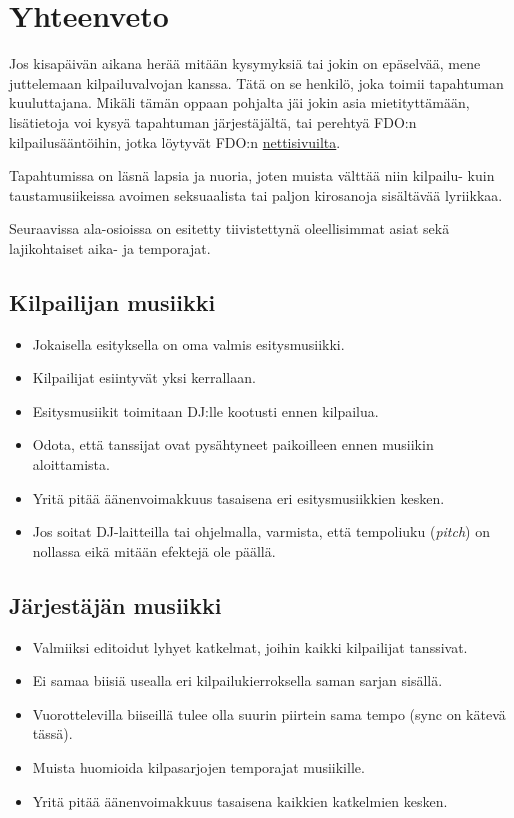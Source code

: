 \documentclass[12pt, a4paper, oneside]{article}
\begin{document}
\section{Yhteenveto} \label{sec:yhteenveto}

Jos kisapäivän aikana herää mitään kysymyksiä tai jokin on epäselvää,
mene juttelemaan kilpailuvalvojan kanssa.
Tätä on se henkilö,
joka toimii tapahtuman kuuluttajana.
Mikäli tämän oppaan pohjalta jäi jokin asia mietityttämään,
lisätietoja voi kysyä tapahtuman järjestäjältä,
tai perehtyä FDO:n kilpailusääntöihin,
jotka löytyvät FDO:n \href{https://fdo.fi/kilpailut/}{nettisivuilta}.

Tapahtumissa on läsnä lapsia ja nuoria,
joten muista välttää niin kilpailu- kuin taustamusiikeissa avoimen seksuaalista tai paljon kirosanoja sisältävää lyriikkaa.

Seuraavissa ala-osioissa on esitetty tiivistettynä oleellisimmat asiat sekä lajikohtaiset aika- ja temporajat.

\subsection{Kilpailijan musiikki} \label{subsec:kilpailijan-musiikki}

\begin{itemize}[itemsep=-2pt]
    \item Jokaisella esityksella on oma valmis esitysmusiikki.
    \item Kilpailijat esiintyvät yksi kerrallaan.
    \item Esitysmusiikit toimitaan DJ:lle kootusti ennen kilpailua.
    \item Odota, että tanssijat ovat pysähtyneet paikoilleen ennen musiikin aloittamista.
    \item Yritä pitää äänenvoimakkuus tasaisena eri esitysmusiikkien kesken.
    \item Jos soitat DJ-laitteilla tai ohjelmalla, varmista, että tempoliuku (\textit{pitch}) on nollassa eikä mitään efektejä ole päällä.
\end{itemize}

\subsection{Järjestäjän musiikki} \label{subsec:jarjestajan-musiikki}

\begin{itemize}[itemsep=-2pt]
    \item Valmiiksi editoidut lyhyet katkelmat, joihin kaikki kilpailijat tanssivat.
    \item Ei samaa biisiä usealla eri kilpailukierroksella saman sarjan sisällä.
    \item Vuorottelevilla biiseillä tulee olla suurin piirtein sama tempo (sync on kätevä tässä).
    \item Muista huomioida kilpasarjojen temporajat musiikille.
    \item Yritä pitää äänenvoimakkuus tasaisena kaikkien katkelmien kesken.
\end{itemize}
\end{document}

